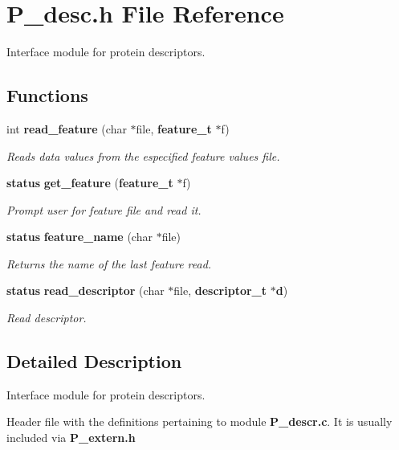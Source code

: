 \section{P\_\-desc.h File Reference}
\label{P__desc_8h}
Interface module for protein descriptors. 


\subsection*{Functions}
\begin{CompactItemize}
\item 
int {\bf read\_\-feature} (char $\ast$file, {\bf feature\_\-t} $\ast$f)
\begin{CompactList}\small\item\em Reads data values from the especified feature values file.\item\end{CompactList}\item 
{\bf status} {\bf get\_\-feature} ({\bf feature\_\-t} $\ast$f)
\begin{CompactList}\small\item\em Prompt user for feature file and read it.\item\end{CompactList}\item 
{\bf status} {\bf feature\_\-name} (char $\ast$file)
\begin{CompactList}\small\item\em Returns the name of the last feature read.\item\end{CompactList}\item 
{\bf status} {\bf read\_\-descriptor} (char $\ast$file, {\bf descriptor\_\-t} $\ast${\bf d})
\begin{CompactList}\small\item\em Read descriptor.\item\end{CompactList}\end{CompactItemize}


\subsection{Detailed Description}
Interface module for protein descriptors.

 

 Header file with the definitions pertaining to module {\bf P\_\-descr.c}. It is usually included via {\bf P\_\-extern.h}

